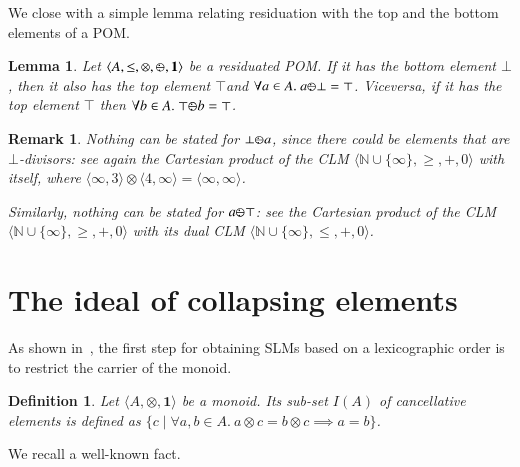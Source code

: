 \documentclass[a4paper]{elsarticle}
\newtheorem{definition}{Definition}
\newtheorem{remark}{Remark}
\newtheorem{lemma}{Lemma}
\newcommand{\monop}{\otimes}
\newcommand{\1}{\mathbf{1}}
\def\odiv{{ \ominus\hspace{-8pt}:}\;}
\begin{document}
We close with a simple lemma relating residuation with the top and the bottom 
elements of a POM.

\begin{lemma}
	\label{someProps}
	Let $\langle A, \leq, \monop, \odiv, \1 \rangle$ be a residuated POM. 
	If it has the bottom element $\bot$, then it also has the top element $\top$and
	$\forall a \in A.\ a \odiv \bot = \top$.
	Viceversa, if it has the top element $\top$ then
	$\forall b \in A.\ \top \odiv b = \top$.
\end{lemma}

\begin{remark}
	Nothing can be stated for $\bot \odiv a$, since there could be elements that are 
	$\bot$-divisors: see again the Cartesian product of the CLM  
	$\langle \mathbb N \cup \{\infty\}, \geq, +, 0 \rangle$ with itself, where 
	$\langle \infty, 3\rangle  \otimes \langle 4, \infty \rangle = \langle \infty,\infty \rangle$. 
	
	Similarly, nothing can be stated for $a \odiv \top$: see the Cartesian 
	product of the CLM  
	$\langle \mathbb N \cup \{\infty\}, \geq, +, 0 \rangle$ with its dual CLM
	$\langle \mathbb N \cup \{\infty\}, \leq, +, 0 \rangle$.
\end{remark}


\section{The ideal of collapsing elements}
\label{sec:collapsing}
As shown in~\cite{GadducciHMW13}, the first step for obtaining SLMs based on a lexicographic order 
is to restrict the carrier of the monoid. 

\begin{definition}
	Let $\langle A, \monop, \1 \rangle$ be a monoid. Its sub-set $I(A)$ 
	of \emph{cancellative} elements is defined as 
	$\{ c \mid \forall a, b \in A.\ a \otimes c = b \otimes c \implies a = b \}$.
\end{definition}

We  recall a well-known fact.
\end{document}
